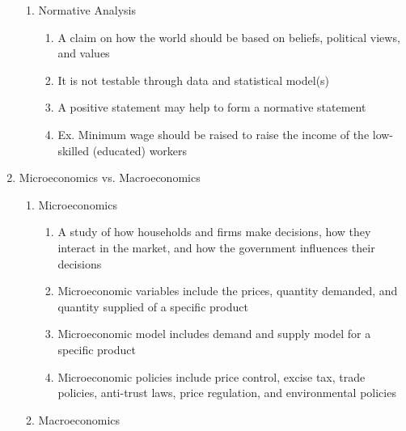 \documentclass[12pt]{article}
\begin{document}
\begin{enumerate}
\begin{enumerate}
          \item Normative Analysis

            \begin{enumerate}

              \item A claim on how the world should be based on beliefs, political views, and values

              \item It is not testable through data and statistical model(s)

              \item A positive statement may help to form a normative statement

              \item Ex. Minimum wage should be raised to raise the income of the low-skilled (educated) workers

            \end{enumerate}

        \end{enumerate}

      \item Microeconomics vs. Macroeconomics

        \begin{enumerate}

          \item Microeconomics

            \begin{enumerate}

              \item A study of how households and firms make decisions, how they interact in the market, and how the government influences their decisions

              \item Microeconomic variables include the prices, quantity demanded, and quantity supplied of a specific product

              \item Microeconomic model includes demand and supply model for a specific product

              \item Microeconomic policies include price control, excise tax, trade policies, anti-trust laws, price regulation, and environmental policies

            \end{enumerate}

          \item Macroeconomics


\end{enumerate}
\end{enumerate}
\end{document}
